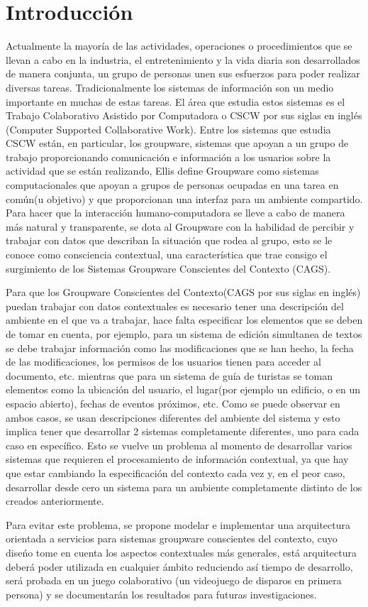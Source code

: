 \section{Introducci\'on}
\label{sec:intro}
Actualmente la mayor\'ia de las actividades, operaciones o procedimientos que se llevan a cabo en la industria, el entretenimiento y la vida diaria son desarrollados de manera conjunta, un grupo de personas unen sus esfuerzos para poder realizar diversas tareas. Tradicionalmente los sistemas de informaci\'on son un medio importante en muchas de estas tareas. El \'area que estudia estos sistemas es el Trabajo Colaborativo Asistido por Computadora o CSCW por sus siglas en ingl\'es (Computer Supported Collaborative Work). Entre los sistemas que estudia CSCW est\'an, en particular, los groupware, sistemas que apoyan a un grupo de trabajo proporcionando comunicaci\'on e informaci\'on a los usuarios sobre la actividad que se est\'an realizando, Ellis \cite{ellis1991groupware} define Groupware como sistemas computacionales que apoyan a grupos de personas ocupadas en una tarea en com\'un(u objetivo) y que proporcionan una interfaz para un ambiente compartido. Para hacer que la interacci\'on humano-computadora se lleve a cabo de manera m\'as natural y transparente, se dota al Groupware con la habilidad de percibir y trabajar con datos que describan la situaci\'on que rodea al grupo, esto se le conoce como consciencia contextual, una caracter\'istica que trae consigo el surgimiento de los Sistemas Groupware Conscientes del Contexto (CAGS).


Para que los Groupware Conscientes del Contexto(CAGS por sus siglas en ingl\'es) puedan trabajar con datos contextuales es necesario tener una descripci\'on del ambiente en el que va a trabajar, hace falta especificar los elementos que se deben de tomar en cuenta, por ejemplo, para un sistema de edici\'on simultanea de textos se debe trabajar informaci\'on como las modificaciones que se han hecho, la fecha de las modificaciones, los permisos de los usuarios tienen para acceder al documento, etc. mientras que para un sistema de gu\'ia de turistas se toman elementos como la ubicaci\'on del usuario, el lugar(por ejemplo un edificio, o en un espacio abierto), fechas de eventos pr\'oximos, etc. Como se puede observar en ambos casos, se usan descripciones diferentes del ambiente del sistema y esto implica tener que desarrollar 2 sistemas completamente diferentes, uno para cada caso en espec\'ifico. Esto se vuelve un problema al momento de desarrollar varios sistemas que requieren el procesamiento de informaci\'on contextual, ya que hay que estar cambiando la especificaci\'on del contexto cada vez y, en el peor caso, desarrollar desde cero un sistema para un ambiente completamente distinto de los creados anteriormente.

Para evitar este problema, se propone modelar e implementar una arquitectura orientada a servicios para sistemas groupware conscientes del contexto, cuyo dise\'no tome en cuenta los aspectos contextuales m\'as generales, est\'a arquitectura deber\'a poder utilizada en cualquier \'ambito reduciendo as\'i tiempo de desarrollo, ser\'a probada en un juego colaborativo (un videojuego de disparos en primera persona) y se documentar\'an los resultados para futuras investigaciones.

